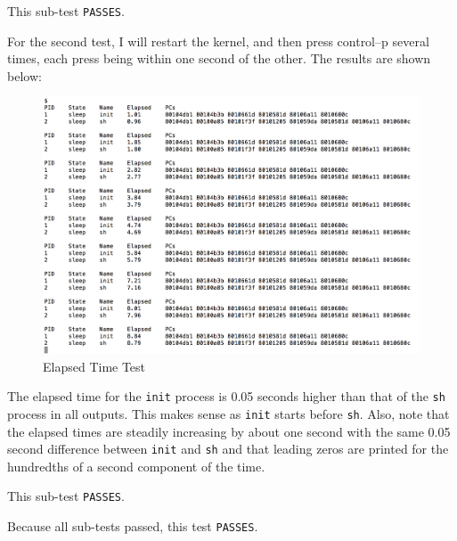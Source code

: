 \documentclass[11pt,letterpaper]{report}
\begin{document}
	This sub-test {\tt PASSES}. 

\newpage
	For the second test, I will restart the kernel, and then press control--p several times, each press being within one second of the other. The results are shown below:

\begin{figure}[h!]
\centering
\includegraphics[width=0.8\linewidth]{ctrl-p-test2.png}
\caption[elapsed time]{Elapsed Time Test}
\label{fig:elapsed}
\end{figure}	
	
	The elapsed time for the  {\tt init} process is 0.05 seconds higher than that of the {\tt sh} process in all outputs. This makes sense as {\tt init} starts before {\tt sh}. Also, note that the elapsed times are steadily increasing by about one second with the same 0.05 second difference between {\tt init} and {\tt sh} and that leading zeros are printed for the hundredths of a second component of the time.
		
	This sub-test {\tt PASSES}.
	
	Because all sub-tests passed, this test {\tt PASSES}. \\
\end{document}
